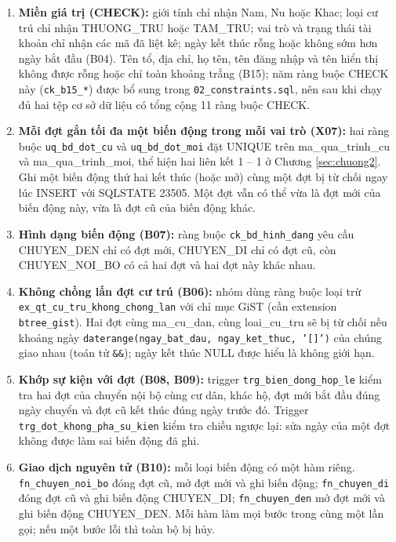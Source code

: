 \begin{enumerate}[leftmargin=*]
    \item \textbf{Miền giá trị (CHECK):} giới tính chỉ nhận Nam, Nu hoặc Khac; loại cư trú chỉ nhận THUONG\_TRU hoặc TAM\_TRU; vai trò và trạng thái tài khoản chỉ nhận các mã đã liệt kê; ngày kết thúc rỗng hoặc không sớm hơn ngày bắt đầu (B04). Tên tổ, địa chỉ, họ tên, tên đăng nhập và tên hiển thị không được rỗng hoặc chỉ toàn khoảng trắng (B15); năm ràng buộc CHECK này (\texttt{ck\_b15\_*}) được bổ sung trong \texttt{02\_constraints.sql}, nên sau khi chạy đủ hai tệp cơ sở dữ liệu có tổng cộng 11 ràng buộc CHECK.
    \item \textbf{Mỗi đợt gắn tối đa một biến động trong mỗi vai trò (X07):} hai ràng buộc \texttt{uq\_bd\_dot\_cu} và \texttt{uq\_bd\_dot\_moi} đặt UNIQUE trên ma\_qua\_trinh\_cu và ma\_qua\_trinh\_moi, thể hiện hai liên kết 1 -- 1 ở Chương \ref{sec:chuong2}. Ghi một biến động thứ hai kết thúc (hoặc mở) cùng một đợt bị từ chối ngay lúc INSERT với SQLSTATE 23505. Một đợt vẫn có thể vừa là đợt mới của biến động này, vừa là đợt cũ của biến động khác.
    \item \textbf{Hình dạng biến động (B07):} ràng buộc \texttt{ck\_bd\_hinh\_dang} yêu cầu CHUYEN\_DEN chỉ có đợt mới, CHUYEN\_DI chỉ có đợt cũ, còn CHUYEN\_NOI\_BO có cả hai đợt và hai đợt này khác nhau.
    \item \textbf{Không chồng lấn đợt cư trú (B06):} nhóm dùng ràng buộc loại trừ \texttt{ex\_qt\_cu\_tru\_khong\_chong\_lan} với chỉ mục GiST (cần extension \texttt{btree\_gist}). Hai đợt cùng ma\_cu\_dan, cùng loai\_cu\_tru sẽ bị từ chối nếu khoảng ngày \texttt{daterange(ngay\_bat\_dau, ngay\_ket\_thuc, '[]')} của chúng giao nhau (toán tử \texttt{\&\&}); ngày kết thúc NULL được hiểu là không giới hạn.
    \item \textbf{Khớp sự kiện với đợt (B08, B09):} trigger \texttt{trg\_bien\_dong\_hop\_le} kiểm tra hai đợt của chuyển nội bộ cùng cư dân, khác hộ, đợt mới bắt đầu đúng ngày chuyển và đợt cũ kết thúc đúng ngày trước đó. Trigger \texttt{trg\_dot\_khong\_pha\_su\_kien} kiểm tra chiều ngược lại: sửa ngày của một đợt không được làm sai biến động đã ghi.
    \item \textbf{Giao dịch nguyên tử (B10):} mỗi loại biến động có một hàm riêng. \texttt{fn\_chuyen\_noi\_bo} đóng đợt cũ, mở đợt mới và ghi biến động; \texttt{fn\_chuyen\_di} đóng đợt cũ và ghi biến động CHUYEN\_DI; \texttt{fn\_chuyen\_den} mở đợt mới và ghi biến động CHUYEN\_DEN. Mỗi hàm làm mọi bước trong cùng một lần gọi; nếu một bước lỗi thì toàn bộ bị hủy.

\end{enumerate}

